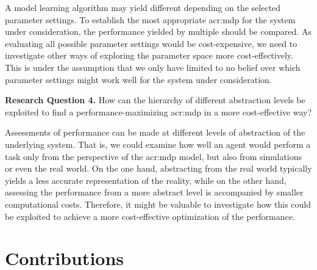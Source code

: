 A model learning algorithm may yield different  depending on the selected parameter settings.
To establish the most appropriate \acrshort{acr:mdp} for the system under consideration, the performance yielded by multiple  should be compared.
As evaluating all possible parameter settings would be cost-expensive, we need to investigate other ways of exploring the parameter space more cost-effectively.
This is under the assumption that we only have limited to no belief over which parameter settings might work well for the system under consideration.

\vspace{16pt}
\noindent%
\textbf{Research Question 4.} How can the hierarchy of different abstraction levels be exploited to find a performance-maximizing \acrshort{acr:mdp} in a more cost-effective way?
\vspace{12pt}

Assessments of performance can be made at different levels of abstraction of the underlying system.
That is, we could examine how well an agent would perform a task only from the perspective of the \acrshort{acr:mdp} model, but also
from simulations or even the real world.
On the one hand, abstracting from the real world typically yields a less accurate representation of the reality, while on the other hand, assessing the performance from a more abstract level is accompanied by smaller computational costs.
Therefore, it might be valuable to investigate how this could be exploited to achieve a more cost-effective optimization of the performance.


\section{Contributions}
\label{sec:contribution}

